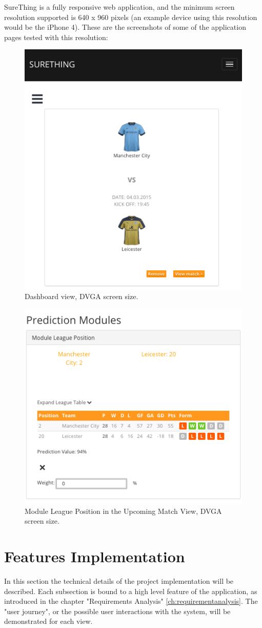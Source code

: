 SureThing is a fully responsive web application, and the minimum screen resolution supported is 640 x 960 pixels (an example device using this resolution would be the iPhone 4). These are the screenshots of some of the application pages tested with this resolution:

\begin{figure}[H]
	\begin{center}
		\includegraphics[width=.50\textwidth]{impl/images/responsiveDashboard}
		\caption{Dashboard view, DVGA screen size.} \label{fig:using:responsivedashboard}
	\end{center}
\end{figure}

\begin{figure}[H]
	\begin{center}
		\includegraphics[width=.50\textwidth]{impl/images/responsiveModuleLeaguePosition}
		\caption{Module League Position in the Upcoming Match View, DVGA screen size.} \label{fig:using:responsivemoduleleagueposition}
	\end{center}
\end{figure}

\section{Features Implementation}
In this section the technical details of the project implementation will be described. Each subsection is bound to a high level feature of the application, as introduced in the chapter "Requirements Analysis" \ref{ch:requirementanalysis}. The "user journey", or the possible user interactions with the system, will be demonstrated for each view.

